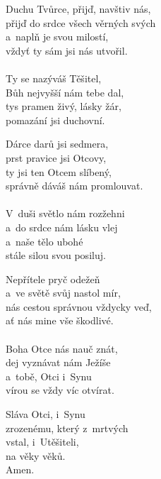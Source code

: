 \begin{translatioMulticol}{4}
Duchu Tvůrce, přijď, navštiv nás,\\
přijď do srdce všech věrných svých\\
a~naplň je svou milostí,\\
vždyť ty sám jsi nás utvořil.\\
\\
Ty se nazýváš Těšitel,\\
Bůh nejvyšší nám tebe dal,\\
tys pramen živý, lásky žár,\\
pomazání jsi duchovní.\columnbreak

Dárce darů jsi sedmera,\\
prst pravice jsi Otcovy,\\
ty jsi ten Otcem slíbený,\\
správně dáváš nám promlouvat.\\
\\
V~duši světlo nám rozžehni\\
a~do srdce nám lásku vlej\\
a~naše tělo ubohé\\
stále silou svou posiluj.\columnbreak

Nepřítele pryč odežeň\\
a~ve světě svůj nastol mír,\\
nás cestou správnou vždycky veď,\\
ať nás mine vše škodlivé.\\
\\
Boha Otce nás nauč znát,\\
dej vyznávat nám Ježíše\\
a~tobě, Otci i~Synu\\
vírou se vždy víc otvírat.\columnbreak

Sláva Otci, i~Synu\\
zrozenému, který z~mrtvých\\
vstal, i~Utěšiteli,\\
na věky věků.\\
Amen.
\end{translatioMulticol}
